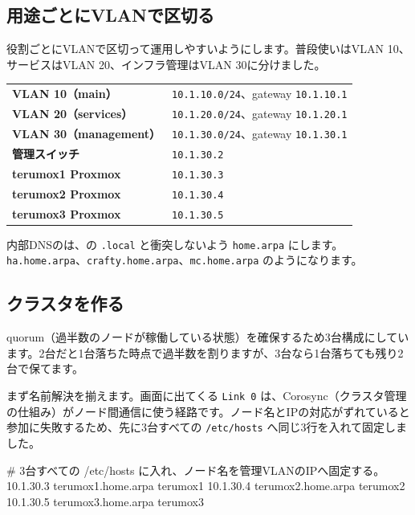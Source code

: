 \subsection{用途ごとにVLANで区切る}

役割ごとにVLANで区切って運用しやすいようにします。普段使いはVLAN 10、サービスはVLAN 20、インフラ管理はVLAN 30に分けました。

\begin{center}
\begin{tabular}{@{}ll@{}}
\textsf{\textbf{VLAN 10（main）}} & \texttt{10.1.10.0/24}、gateway \texttt{10.1.10.1} \\
\textsf{\textbf{VLAN 20（services）}} & \texttt{10.1.20.0/24}、gateway \texttt{10.1.20.1} \\
\textsf{\textbf{VLAN 30（management）}} & \texttt{10.1.30.0/24}、gateway \texttt{10.1.30.1} \\
\textsf{\textbf{管理スイッチ}} & \texttt{10.1.30.2} \\
\textsf{\textbf{terumox1 Proxmox}} & \texttt{10.1.30.3} \\
\textsf{\textbf{terumox2 Proxmox}} & \texttt{10.1.30.4} \\
\textsf{\textbf{terumox3 Proxmox}} & \texttt{10.1.30.5} \\
\end{tabular}
\end{center}

内部DNSのは、の \texttt{.local} と衝突しないよう \texttt{home.arpa} にします。\texttt{ha.home.arpa}、\texttt{crafty.home.arpa}、\texttt{mc.home.arpa} のようになります。

\subsection{クラスタを作る}

quorum（過半数のノードが稼働している状態）を確保するため3台構成にしています。2台だと1台落ちた時点で過半数を割りますが、3台なら1台落ちても残り2台で保てます。

まず名前解決を揃えます。画面に出てくる \texttt{Link 0} は、Corosync（クラスタ管理の仕組み）がノード間通信に使う経路です。ノード名とIPの対応がずれていると参加に失敗するため、先に3台すべての \texttt{/etc/hosts} へ同じ3行を入れて固定しました。

\begin{commands}
# 3台すべての /etc/hosts に入れ、ノード名を管理VLANのIPへ固定する。
10.1.30.3 terumox1.home.arpa terumox1
10.1.30.4 terumox2.home.arpa terumox2
10.1.30.5 terumox3.home.arpa terumox3
\end{commands}

